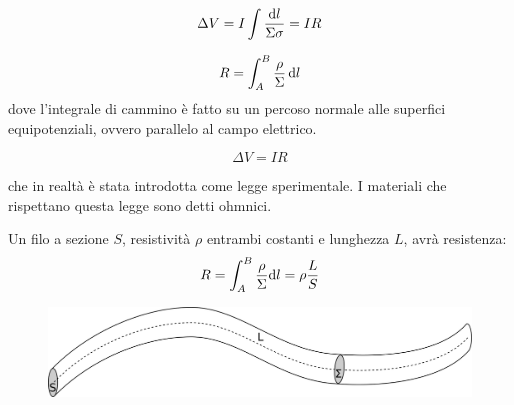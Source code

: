 \begin{equation}
  \Delta V = I\int \frac{\mathrm{d} l}{\Sigma\sigma}=IR
\end{equation}
\begin{Def}
  \begin{equation}R=\int_A^B \frac{\rho}{\Sigma}\,\mathrm{d} l\end{equation}
  dove l'integrale di cammino è fatto su un percoso normale alle superfici equipotenziali, ovvero parallelo al campo elettrico.
\end{Def}
\begin{legge}[Ohm]
  \begin{equation}
    \Delta V=IR
  \end{equation}
\end{legge}
che in realtà è stata introdotta come legge sperimentale. I materiali che rispettano questa legge sono detti ohmnici.
\begin{Es}[Filo]
  Un filo a sezione $S$, resistività $\rho$ entrambi costanti e lunghezza $L$, avrà resistenza:
  \begin{equation}
    R=\int_A^B \frac{\rho}{\Sigma}\mathrm{d} l=\rho\frac{L}{S}
  \end{equation}
  \begin{figure}[htbp]
    \centering
    \includegraphics[scale=0.5]{immagini/fisica2/filo_serpente}
  \end{figure}
\end{Es}
